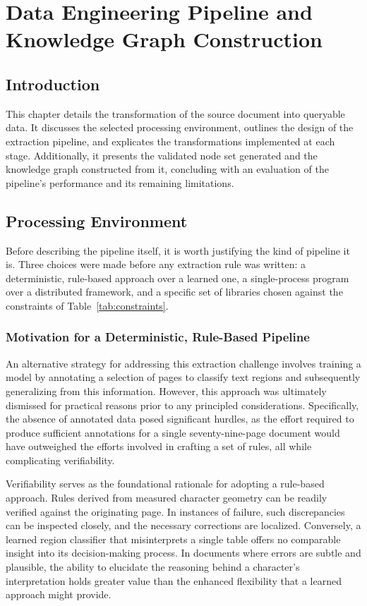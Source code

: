 \chapter{Data Engineering Pipeline and Knowledge Graph Construction}
\label{ch:pipeline}
\minitoc

\section*{Introduction}

This chapter details the transformation of the source document into queryable data. It discusses the selected processing environment, outlines the design of the extraction pipeline, and explicates the transformations implemented at each stage. Additionally, it presents the validated node set generated and the knowledge graph constructed from it, concluding with an evaluation of the pipeline's performance and its remaining limitations.

\section{Processing Environment}

Before describing the pipeline itself, it is worth justifying the kind of pipeline it is.
Three choices were made before any extraction rule was written: a deterministic, rule-based
approach over a learned one, a single-process program over a distributed framework, and a
specific set of libraries chosen against the constraints of Table~\ref{tab:constraints}.

\subsection{Motivation for a Deterministic, Rule-Based Pipeline}

An alternative strategy for addressing this extraction challenge involves training a model by annotating a selection of pages to classify text regions and subsequently generalizing from this information. However, this approach was ultimately dismissed for practical reasons prior to any principled considerations. Specifically, the absence of annotated data posed significant hurdles, as the effort required to produce sufficient annotations for a single seventy-nine-page document would have outweighed the efforts involved in crafting a set of rules, all while complicating verifiability.

Verifiability serves as the foundational rationale for adopting a rule-based approach. Rules derived from measured character geometry can be readily verified against the originating page. In instances of failure, such discrepancies can be inspected closely, and the necessary corrections are localized. Conversely, a learned region classifier that misinterprets a single table offers no comparable insight into its decision-making process. In documents where errors are subtle and plausible, the ability to elucidate the reasoning behind a character's interpretation holds greater value than the enhanced flexibility that a learned approach might provide.

